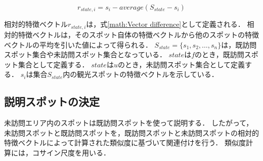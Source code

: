 \documentclass[submit]{ipsj}
\begin{document}
%
\begin{equation}
  r_{state,i}=s_i-average(S_{state}-s_i)
  \label{math:Vector difference}
\end{equation}

相対的特徴ベクトル$r_{state,i}$は，式\ref{math:Vector difference}として定義される．
相対的特徴ベクトルは，そのスポット自体の特徴ベクトルから他のスポットの特徴ベクトルの平均を引いた値によって得られる．
$S_{state} =\{s_1,s_2,\dots,s_n\}$は，既訪問スポット集合や未訪問スポット集合となっている．
$state$は$f$のとき，既訪問スポット集合として定義する．
$state$は$u$のとき，未訪問スポット集合として定義する．
$s_i$は集合$S_{state}$内の観光スポットの特徴ベクトルを示している．

\subsection{説明スポットの決定}
\label{subsec:説明スポットの決定}
未訪問エリア内のスポットは既訪問スポットを使って説明する．
したがって，未訪問スポットと既訪問スポットを，既訪問スポットと未訪問スポットの相対的特徴ベクトルによって計算された類似度に基づいて関連付けを行う．
類似度計算には，コサイン尺度を用いる．
\end{document}
